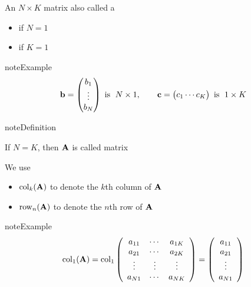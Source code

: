 \documentclass[letterpaper,10pt,english]{jupyterBook}
\begin{document}
\sphinxAtStartPar
An \(N \times K\) matrix also called a
\begin{itemize}
\item {} 
\sphinxAtStartPar
{} if \(N = 1\)

\item {} 
\sphinxAtStartPar
{} if \(K = 1\)

\end{itemize}

\begin{sphinxadmonition}{note}{Example}
\begin{equation*}
\begin{split}
%
{\bf b} 
= 
\begin{pmatrix}
b_1 \\
\vdots \\
b_N 
\end{pmatrix}
\text{ is }\; N \times 1,
\qquad
{\bf c} 
= 
\begin{pmatrix}
c_1 \cdots c_K 
\end{pmatrix}
\text{ is }\; 
1 \times K
%
\end{split}
\end{equation*}\end{sphinxadmonition}

\begin{sphinxadmonition}{note}{Definition}

\sphinxAtStartPar
If \(N = K\), then \({\bf A}\) is called  matrix
\end{sphinxadmonition}

\sphinxAtStartPar
We use
\begin{itemize}
\item {} 
\sphinxAtStartPar
\(\mathrm{col}_k({\bf A})\) to denote the \(k\)\sphinxhyphen{}th column of \({\bf A}\)

\item {} 
\sphinxAtStartPar
\(\mathrm{row}_n({\bf A})\) to denote the \(n\)\sphinxhyphen{}th row of \({\bf A}\)

\end{itemize}

\begin{sphinxadmonition}{note}{Example}
\begin{equation*}
\begin{split}
%
\mathrm{col}_1({\bf A})
=
\mathrm{col}_1
\left(
\begin{array}{ccc}
a_{11} & \cdots & a_{1K} \\
a_{21} & \cdots & a_{2K} \\
\vdots & \vdots & \vdots \\
a_{N1} & \cdots & a_{NK} 
\end{array}
\right)
=
\left(
\begin{array}{c}
a_{11} \\
a_{21} \\
\vdots \\
a_{N1} 
\end{array}
\right)
%
\end{split}
\end{equation*}\end{sphinxadmonition}
\end{document}
